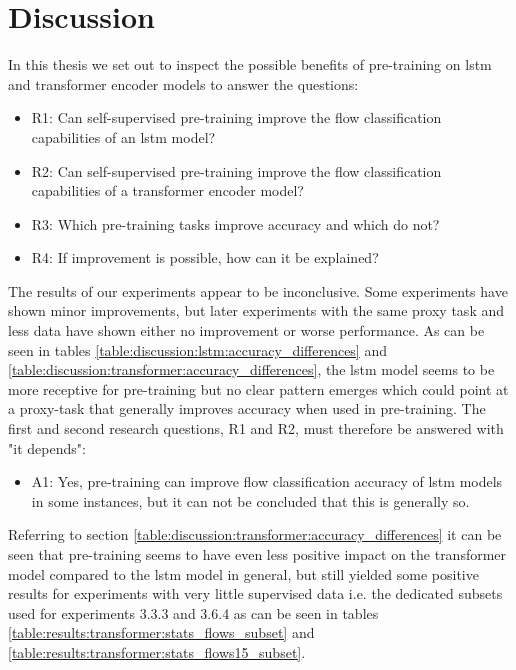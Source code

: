 \chapter{Discussion} \label{sec:discussion}

In this thesis we set out to inspect the possible benefits of pre-training on \gls{lstm} and transformer encoder models to answer the questions:

\begin{itemize}
	\item R1: Can self-supervised pre-training improve the flow classification capabilities of an \gls{lstm} model?
	\item R2: Can self-supervised pre-training improve the flow classification capabilities of a transformer encoder model?
	\item R3: Which pre-training tasks improve accuracy and which do not?
	\item R4: If improvement is possible, how can it be explained?
\end{itemize}

The results of our experiments appear to be inconclusive. Some experiments have shown minor improvements, but later experiments with the same proxy task and less data have shown either no improvement or worse performance. As can be seen in tables \ref{table:discussion:lstm:accuracy_differences} and \ref{table:discussion:transformer:accuracy_differences}, the \gls{lstm} model seems to be more receptive for pre-training but no clear pattern emerges which could point at a proxy-task that generally improves accuracy when used in pre-training. The first and second research questions, R1 and R2, must therefore be answered with "it depends":

\begin{itemize}
	\item A1: Yes, pre-training can improve flow classification accuracy of \gls{lstm} models in some instances, but it can not be concluded that this is generally so.
\end{itemize}

Referring to section \ref{table:discussion:transformer:accuracy_differences} it can be seen that pre-training seems to have even less positive impact on the transformer model compared to the \gls{lstm} model in general, but still yielded some positive results for experiments with very little supervised data i.e. the dedicated subsets used for experiments 3.3.3 and 3.6.4 as can be seen in tables \ref{table:results:transformer:stats_flows_subset} and \ref{table:results:transformer:stats_flows15_subset}.

